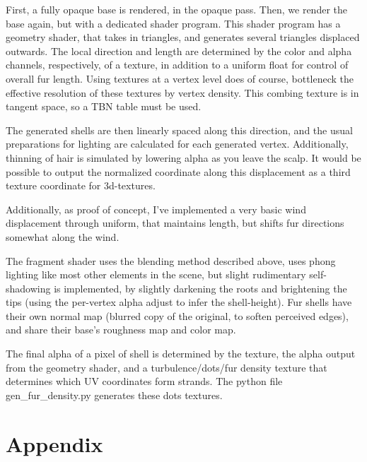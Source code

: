 \documentclass[a4paper, 12pt]{article}
\begin{document}
    First, a fully opaque base is rendered,
    in the opaque pass.
    Then, we render the base again,
    but with a dedicated shader program.
    This shader program has a geometry shader,
    that takes in triangles,
    and generates several triangles displaced outwards.
    The local direction and length
    are determined by the color and alpha channels,
    respectively, of a texture,
    in addition to a uniform float for control of overall fur length.
    Using textures at a vertex level does of course,
    bottleneck the effective resolution of these textures by vertex density.
    This combing texture is in tangent space, so a TBN table must be used.

    The generated shells are then linearly spaced along this direction,
    and the usual preparations for lighting
    are calculated for each generated vertex.
    Additionally,
    thinning of hair is simulated by lowering alpha as you leave the scalp.
    It would be possible to output the normalized coordinate
    along this displacement as a third texture coordinate for 3d-textures.

    Additionally, as proof of concept,
    I've implemented a very basic wind displacement
    through uniform, that maintains length,
    but shifts fur directions somewhat along the wind.

    The fragment shader uses the blending method described above,
    uses phong lighting like most other elements in the scene,
    but slight rudimentary self-shadowing is implemented,
    by slightly darkening the roots and brightening the tips
    (using the per-vertex alpha adjust to infer the shell-height).
    Fur shells have their own normal map (blurred copy of the original,
    to soften perceived edges),
    and share their base's roughness map and color map.

    The final alpha of a pixel of shell is determined by
    the texture, the alpha output from the geometry shader,
    and a turbulence/dots/fur density texture that determines which UV coordinates form strands.
    The python file gen\_fur\_density.py generates these dots textures.










    \section*{Appendix}

    
    
\end{document}
